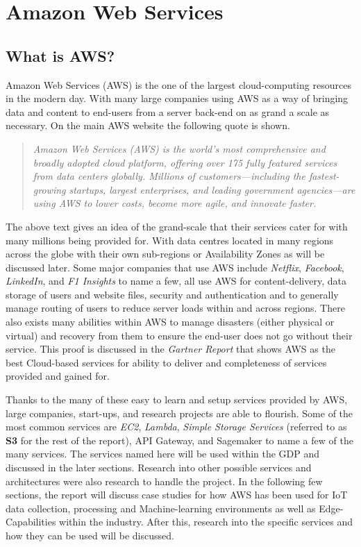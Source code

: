 \section{Amazon Web Services}
\subsection{What is AWS?}
Amazon Web Services (AWS) is the one of the largest cloud-computing resources in the modern day. With many large companies using AWS as a way of bringing data and content to end-users from a server back-end on as grand a scale as necessary. On the main AWS website the following quote is shown.
\begin{quote}
\textit{Amazon Web Services (AWS) is the world’s most comprehensive and broadly adopted cloud platform, offering over 175 fully featured services from data centers globally. Millions of customers—including the fastest-growing startups, largest enterprises, and leading government agencies—are using AWS to lower costs, become more agile, and innovate faster.}  \cite{ch1_2_what_is_aws} 
\end{quote}

The above text gives an idea of the grand-scale that their services cater for with many millions being provided for. With data centres located in many regions across the globe with their own sub-regions or Availability Zones as will be discussed later. Some major companies that use AWS include \textit{Netflix}, \textit{Facebook}, \textit{LinkedIn}, and \textit{F1 Insights} to name a few, all use AWS for content-delivery, data storage of users and website files, security and authentication and to generally manage routing of users to reduce server loads within and across regions. There also exists many abilities within AWS to manage disasters (either physical or virtual) and recovery from them to ensure the end-user does not go without their service. This proof is discussed in the \textit{Gartner Report}\cite{ch1_2_amazon_is_best} that shows AWS as the best Cloud-based services for ability to deliver and completeness of services provided and gained for.

Thanks to the many of these easy to learn and setup services provided by AWS, large companies, start-ups, and research projects are able to flourish. Some of the most common services are \textit{EC2}, \textit{Lambda}, \textit{Simple Storage Services} (referred to as \textbf{S3} for the rest of the report), API Gateway, and Sagemaker to name a few of the many services. The services named here will be used within the GDP and discussed in the later sections. Research into other possible services and architectures were also research to handle the project. In the following few sections, the report will discuss case studies for how AWS has been used for IoT data collection, processing and Machine-learning environments as well as Edge-Capabilities within the industry. After this, research into the specific services and how they can be used will be discussed.

